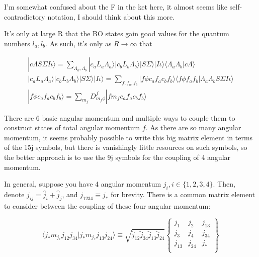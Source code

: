 \documentclass[prl, longbibliography]{revtex4-2}
\begin{document}
I'm somewhat confused about the F in the ket here, it almost seems like self-contradictory notation, I should think about this more. 

It's only at large R that the BO states gain good values for the quantum numbers $l_a, l_b$. As such, it's only as $R\rightarrow\infty$ that

\begin{equation}
\begin{split}
|c\Lambda S \Sigma I \iota\rangle = \sum_{\Lambda_a, \Lambda_b}|c_a L_a \Lambda_a \rangle |c_b L_b \Lambda_b\rangle |S\Sigma\rangle |I\iota\rangle\langle\Lambda_a \Lambda_b|c\Lambda\rangle\\
|c_a L_a\Lambda_a\rangle|c_b L_b \Lambda_b\rangle|S\Sigma\rangle|I\iota\rangle
=\sum_{f,f_a,f_b} |f\phi c_a f_a c_b f_b \rangle \langle f\phi f_a f_b | \Lambda_a \Lambda_b S\Sigma I \iota \rangle
\\
|f\phi c_a f_a c_b f_b\rangle
=\sum_{m_f} D_{m_f\phi}^{f}|f m_f c_a f_a c_b f_b\rangle
\end{split}
\end{equation}

There are 6 basic angular momentum and multiple ways to couple them to construct states of total angular momentum $f$. As there are so many angular momentum, it seems probably possible to write this big matrix element in terms of the 15j symbols, but there is vanishingly little resources on such symbols, so the better approach is to use the 9j symbols for the coupling of 4 angular momentum. 

In general, suppose you have 4 angular momentum $j_i, i\in\{1,2,3,4\}$. Then, denote $\hat{j}_{ij}=\hat{j}_i+\hat{j}_j$, and $j_{1234}\equiv j_*$ for brevity. There is a common matrix element to consider between the coupling of these four angular momentum:

\begin{equation}
\langle j_{*} m_{j_{*}} j_{12}j_{34}|j_{*} m_{j_{*}}j_{13}j_{24}\rangle
\equiv\sqrt{\breve{j}_{12}\breve{j}_{34}\breve{j}_{13}\breve{j}_{24}}
\begin{Bmatrix}
j_1 & j_2 & j_{13}\\
j_3 & j_4 & j_{34}\\
j_{13} & j_{24} & j_{*}\\
\end{Bmatrix}
\end{equation} 
\end{document}
